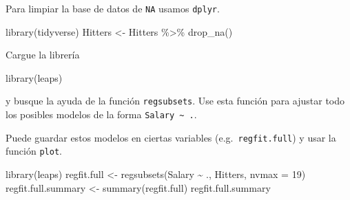\documentclass[
  12pt,
]{book}
\newenvironment{Shaded}{\begin{snugshade}}{\end{snugshade}}
\newcommand{\AttributeTok}[1]{\textcolor[rgb]{0.77,0.63,0.00}{#1}}
\newcommand{\DecValTok}[1]{\textcolor[rgb]{0.00,0.00,0.81}{#1}}
\newcommand{\FunctionTok}[1]{\textcolor[rgb]{0.00,0.00,0.00}{#1}}
\newcommand{\NormalTok}[1]{#1}
\newcommand{\OtherTok}[1]{\textcolor[rgb]{0.56,0.35,0.01}{#1}}
\newcommand{\SpecialCharTok}[1]{\textcolor[rgb]{0.00,0.00,0.00}{#1}}
\begin{document}
Para limpiar la base de datos de \texttt{NA} usamos \texttt{dplyr}.

\begin{Shaded}
\begin{Highlighting}[]
\FunctionTok{library}\NormalTok{(tidyverse)}
\NormalTok{Hitters }\OtherTok{\textless{}{-}}\NormalTok{ Hitters }\SpecialCharTok{\%\textgreater{}\%}
    \FunctionTok{drop\_na}\NormalTok{()}
\end{Highlighting}
\end{Shaded}

Cargue la librería

\begin{Shaded}
\begin{Highlighting}[]
\FunctionTok{library}\NormalTok{(leaps)}
\end{Highlighting}
\end{Shaded}

y busque la ayuda de la función \texttt{regsubsets}. Use esta función
para ajustar todo los posibles modelos de la forma
\texttt{Salary\ \textasciitilde{}\ .}.

Puede guardar estos modelos en ciertas variables
(e.g.~\texttt{regfit.full}) y usar la función \texttt{plot}.

\begin{Shaded}
\begin{Highlighting}[]
\FunctionTok{library}\NormalTok{(leaps)}
\NormalTok{regfit.full }\OtherTok{\textless{}{-}} \FunctionTok{regsubsets}\NormalTok{(Salary }\SpecialCharTok{\textasciitilde{}}\NormalTok{ ., Hitters, }\AttributeTok{nvmax =} \DecValTok{19}\NormalTok{)}
\NormalTok{regfit.full.summary }\OtherTok{\textless{}{-}} \FunctionTok{summary}\NormalTok{(regfit.full)}
\NormalTok{regfit.full.summary}
\end{Highlighting}
\end{Shaded}
\end{document}
